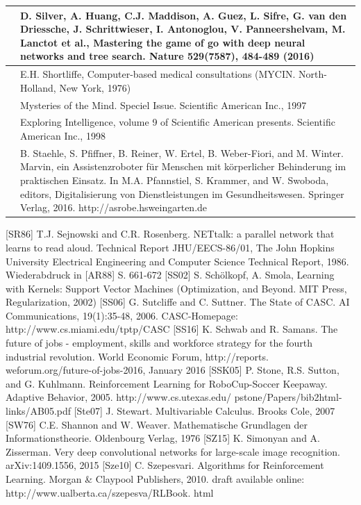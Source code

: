 \documentclass[10pt]{book}
\begin{document}
\begin{center}
\begin{tabular}{|l|l|}
\hline [SHM+16] & D. Silver, A. Huang, C.J. Maddison, A. Guez, L. Sifre, G. van den Driessche, J. Schrittwieser, I. Antonoglou, V. Panneershelvam, M. Lanctot et al., Mastering the game of go with deep neural networks and tree search. Nature 529(7587), 484-489 (2016) \\
\hline [Sho76] & E.H. Shortliffe, Computer-based medical consultations (MYCIN. North-Holland, New York, 1976) \\
\hline [Spe97] & Mysteries of the Mind. Speciel Issue. Scientific American Inc., 1997 \\
\hline [Spe98] & Exploring Intelligence, volume 9 of Scientific American presents. Scientific American Inc., 1998 \\
\hline [SPR+16] & B. Staehle, S. Pfiffner, B. Reiner, W. Ertel, B. Weber-Fiori, and M. Winter. Marvin, ein Assistenzroboter für Menschen mit körperlicher Behinderung im praktischen Einsatz. In M.A. Pfannstiel, S. Krammer, and W. Swoboda, editors, Digitalisierung von Dienstleistungen im Gesundheitswesen. Springer Verlag, 2016. http://asrobe.hsweingarten.de \\
\hline
\end{tabular}
[SR86] T.J. Sejnowski and C.R. Rosenberg. NETtalk: a parallel network that learns to read aloud. Technical Report JHU/EECS-86/01, The John Hopkins University Electrical Engineering and Computer Science Technical Report, 1986. Wiederabdruck in [AR88] S. 661-672
[SS02] S. Schölkopf, A. Smola, Learning with Kernels: Support Vector Machines (Optimization, and Beyond. MIT Press, Regularization, 2002)
[SS06] G. Sutcliffe and C. Suttner. The State of CASC. AI Communications, 19(1):35-48, 2006. CASC-Homepage: http://www.cs.miami.edu/tptp/CASC
[SS16] K. Schwab and R. Samans. The future of jobs - employment, skills and workforce strategy for the fourth industrial revolution. World Economic Forum, http://reports. weforum.org/future-of-jobs-2016, January 2016
[SSK05] P. Stone, R.S. Sutton, and G. Kuhlmann. Reinforcement Learning for RoboCup-Soccer Keepaway. Adaptive Behavior, 2005. http://www.cs.utexas.edu/ pstone/Papers/bib2html-links/AB05.pdf
[Ste07] J. Stewart. Multivariable Calculus. Brooks Cole, 2007
[SW76] C.E. Shannon and W. Weaver. Mathematische Grundlagen der Informationstheorie. Oldenbourg Verlag, 1976
[SZ15] K. Simonyan and A. Zisserman. Very deep convolutional networks for large-scale image recognition. arXiv:1409.1556, 2015
[Sze10] C. Szepesvari. Algorithms for Reinforcement Learning. Morgan \& Claypool Publishers, 2010. draft available online: http://www.ualberta.ca/szepesva/RLBook. html

\end{center}
\end{document}
